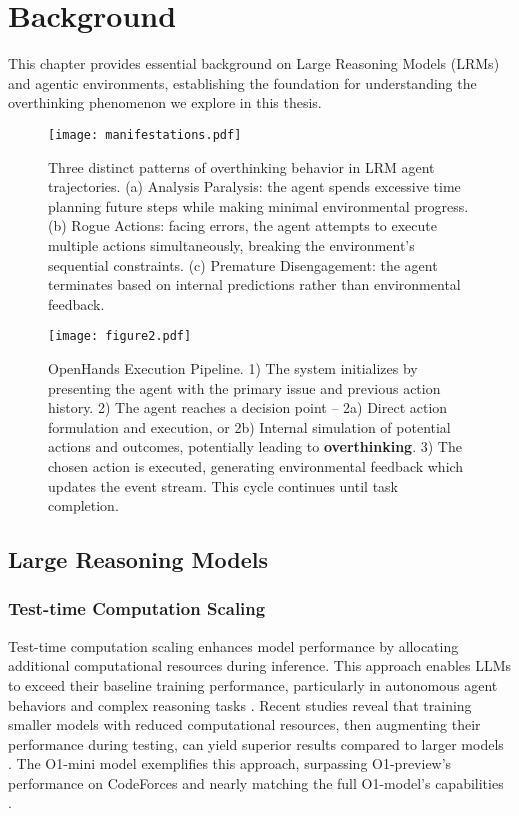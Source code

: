 \chapter{Background}
\label{background}

This chapter provides essential background on Large Reasoning Models (LRMs) and agentic environments, establishing the foundation for understanding the overthinking phenomenon we explore in this thesis.

\begin{figure}[t]
    \centering
    \texttt{[image: manifestations.pdf]}
    \caption{Three distinct patterns of overthinking behavior in LRM agent trajectories. (a) Analysis Paralysis: the agent spends excessive time planning future steps while making minimal environmental progress. (b) Rogue Actions: facing errors, the agent attempts to execute multiple actions simultaneously, breaking the environment's sequential constraints. (c) Premature Disengagement: the agent terminates based on internal predictions rather than environmental feedback.}
    \label{fig:manifestations}
\end{figure}

\begin{figure}[t]
    \centering
    \texttt{[image: figure2.pdf]}
    \caption{OpenHands Execution Pipeline. 1) The system initializes by presenting the agent with the primary issue and previous action history. 2) The agent reaches a decision point -- 2a) Direct action formulation and execution, or 2b) Internal simulation of potential actions and outcomes, potentially leading to \textbf{overthinking}. 3) The chosen action is executed, generating environmental feedback which updates the event stream. This cycle continues until task completion.}
    \label{fig:figure3}
\end{figure}

\section{Large Reasoning Models}
\label{sec:lrm}

\subsection{Test-time Computation Scaling}
Test-time computation scaling enhances model performance by allocating additional computational resources during inference. This approach enables LLMs to exceed their baseline training performance, particularly in autonomous agent behaviors and complex reasoning tasks \cite{qu2024recursiveintrospectionteachinglanguage, singh2024humandatascalingselftraining, wei2023chainofthoughtpromptingelicitsreasoning}. Recent studies reveal that training smaller models with reduced computational resources, then augmenting their performance during testing, can yield superior results compared to larger models \cite{snell2024scalingllmtesttimecompute, wu2024inferencescalinglawsempirical}. The O1-mini model exemplifies this approach, surpassing O1-preview's performance on CodeForces \cite{codeforces} and nearly matching the full O1-model's capabilities \cite{openai_learning_to_reason_2024, openai_O1_mini}.

